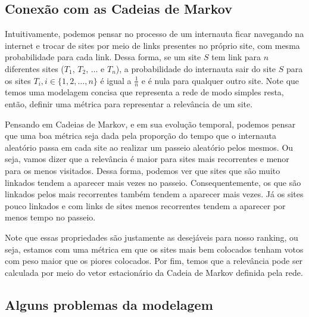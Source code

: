 \documentclass{article}
\begin{document}

\subsection*{Conexão com as Cadeias de Markov}

Intuitivamente, podemos pensar no processo de um internauta ficar navegando na internet e trocar de sites por meio de links presentes no próprio site, com mesma probabilidade para cada link. Dessa forma, se um site $S$ tem link para $n$ diferentes sites ($T_1$, $T_2$, $\dots$ e $T_n$), a probabilidade do internauta sair do site $S$ para os sites $T_i, i \in \{1, 2, \dots, n\}$ é igual a $\frac{1}{n}$ e é nula para qualquer outro site. Note que temos uma modelagem concisa que representa a rede de modo simples resta, então, definir uma métrica para representar a relevância de um site.

Pensando em Cadeias de Markov, e em sua evolução temporal, podemos pensar que uma boa métrica seja dada pela proporção do tempo que o internauta aleatório passa em cada site ao realizar um passeio aleatório pelos mesmos. Ou seja, vamos dizer que a relevância é maior para sites mais recorrentes e menor para os menos visitados. Dessa forma, podemos ver que sites que são muito linkados tendem a aparecer mais vezes no passeio. Consequentemente, os que são linkados pelos mais recorrentes também tendem a aparecer mais vezes. Já os sites pouco linkados e com links de sites menos recorrentes tendem a aparecer por menos tempo no passeio.

Note que essas propriedades são justamente as desejáveis para nosso ranking, ou seja, estamos com uma métrica em que os sites mais bem colocados tenham votos com peso maior que os piores colocados. Por fim, temos que a relevância pode ser calculada por meio do vetor estacionário da Cadeia de Markov definida pela rede.

\subsection*{Alguns problemas da modelagem}

\end{document}
